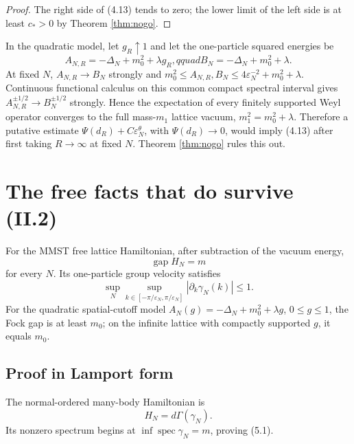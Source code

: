 \documentclass[11pt,a4paper]{article}
\newcommand{\eps}{\varepsilon}
\DeclareMathOperator{\gap}{gap}
\begin{document}
\begin{proof}
The right side of (4.13) tends to zero; the lower limit of the left side is at
least $c_*>0$ by Theorem \ref{thm:nogo}.
\end{proof}

\begin{remark}
In the quadratic model, let $g_R\uparrow1$ and let the one-particle squared
energies be
\[
 A_{N,R}=-\Delta_N+m_0^2+\lambda g_R,qquad
 B_N=-\Delta_N+m_0^2+\lambda.
\]
At fixed $N$, $A_{N,R}\to B_N$ strongly and
$m_0^2\leq A_{N,R},B_N\leq 4\eps_N^{-2}+m_0^2+\lambda$.  Continuous functional
calculus on this common compact spectral interval gives
$A_{N,R}^{\pm1/2}\to B_N^{\pm1/2}$ strongly.  Hence the expectation of every
finitely supported Weyl operator converges to the full mass-$m_1$ lattice vacuum,
$m_1^2=m_0^2+\lambda$.  Therefore a putative estimate
$\Psi(d_R)+C\eps_N^\theta$, with $\Psi(d_R)\to0$, would imply (4.13) after first
taking $R\to\infty$ at fixed $N$.  Theorem \ref{thm:nogo} rules this out.
\end{remark}

\section{The free facts that do survive (II.2)}\label{sec:freefacts}

\begin{proposition}\label{prop:gap-velocity}
For the MMST free lattice Hamiltonian, after subtraction of the vacuum energy,
\[
 \gap H_N=m                                                       \tag{5.1}
\]
for every $N$.  Its one-particle group velocity satisfies
\[
 \sup_N\sup_{k\in[-\pi/\eps_N,\pi/\eps_N]}
 |\partial_k\gamma_N(k)|\leq1.                                  \tag{5.2}
\]
For the quadratic spatial-cutoff model
$A_N(g)=-\Delta_N+m_0^2+\lambda g$, $0\leq g\leq1$, the Fock gap is at least
$m_0$; on the infinite lattice with compactly supported $g$, it equals $m_0$.
\end{proposition}

\subsection*{Proof in Lamport form}


The normal-ordered many-body Hamiltonian is
\[
 H_N=d\Gamma(\gamma_N).
\]
Its nonzero spectrum begins at $\inf\operatorname{spec}\gamma_N=m$, proving
(5.1).
\end{document}
